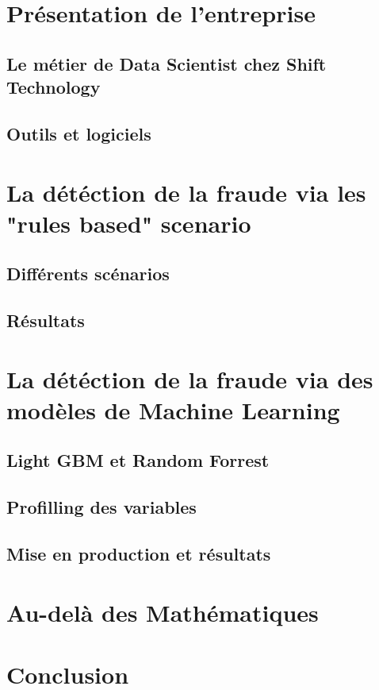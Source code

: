\documentclass[12pt]{report}
\begin{document}
\section{Présentation de l'entreprise}
\subsection{Le métier de Data Scientist chez Shift Technology}
\subsection{Outils et logiciels}

\section{La détéction de la fraude via les "rules based" scenario}
\subsection{Différents scénarios}
\subsection{Résultats}
\section{La détéction de la fraude via des modèles de Machine Learning}
\subsection{Light GBM et Random Forrest}
\subsection{Profilling des variables}
\subsection{Mise en production et résultats}
\section{Au-delà des Mathématiques}

\section{Conclusion}
\end{document}
